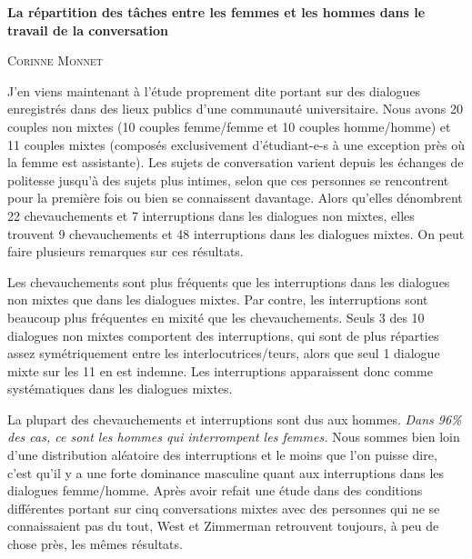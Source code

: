 \documentclass[12pt]{article}
\begin{document}
\begin{center}
\textbf{
\large
  La répartition des tâches entre les femmes et les hommes dans le travail de la conversation
}

\textsc{
  Corinne Monnet
}
\end{center}

\noindent {}

\vspace{1cm}

J’en viens maintenant à l’étude proprement dite portant sur des dialogues enregistrés dans des lieux publics d’une communauté universitaire. Nous avons 20 couples non mixtes (10 couples femme/femme et 10 couples homme/homme) et 11 couples mixtes (composés exclusivement d’étudiant-e-s à une exception près où la femme est assistante). Les sujets de conversation varient depuis les échanges de politesse jusqu’à des sujets plus intimes, selon que ces personnes se rencontrent pour la première fois ou bien se connaissent davantage. Alors qu’elles dénombrent 22 chevauchements et 7 interruptions dans les dialogues non mixtes, elles trouvent 9 chevauchements et 48 interruptions dans les dialogues mixtes. On peut faire plusieurs remarques sur ces résultats.

Les chevauchements sont plus fréquents que les interruptions dans les dialogues non mixtes que dans les dialogues mixtes. Par contre, les interruptions sont beaucoup plus fréquentes en mixité que les chevauchements. Seuls 3 des 10 dialogues non mixtes comportent des interruptions, qui sont de plus réparties assez symétriquement entre les interlocutrices/teurs, alors que seul 1 dialogue mixte sur les 11 en est indemne. Les interruptions apparaissent donc comme systématiques dans les dialogues mixtes.

La plupart des chevauchements et interruptions sont dus aux hommes. \emph{Dans 96\% des cas, ce sont les hommes qui interrompent les femmes.} Nous sommes bien loin d’une distribution aléatoire des interruptions et le moins que l’on puisse dire, c’est qu’il y a une forte dominance masculine quant aux interruptions dans les dialogues femme/homme. Après avoir refait une étude dans des conditions différentes portant sur cinq conversations mixtes avec des personnes qui ne se connaissaient pas du tout, West et Zimmerman retrouvent toujours, à peu de chose près, les mêmes résultats.
\end{document}

